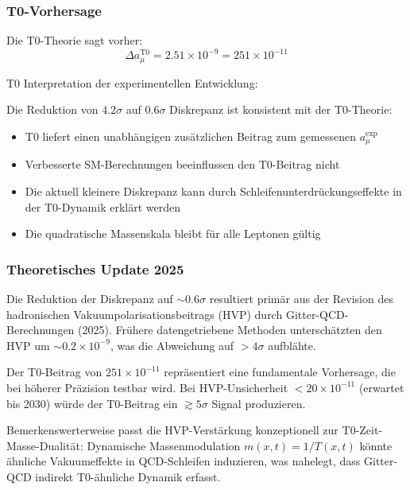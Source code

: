 \documentclass[12pt,a4paper]{article}
\begin{document}
	\subsubsection{T0-Vorhersage}
	Die T0-Theorie sagt vorher:
	\begin{equation}
		\Delta a_\mu^{\mathrm{T0}} = 2.51 \times 10^{-9} = 251 \times 10^{-11}
	\end{equation}
	
	\begin{explanation}
		T0 Interpretation der experimentellen Entwicklung:
		
		Die Reduktion von $4.2\sigma$ auf $0.6\sigma$ Diskrepanz ist konsistent mit der T0-Theorie:
		\begin{itemize}
			\item T0 liefert einen unabhängigen zusätzlichen Beitrag zum gemessenen $a_\mu^{\mathrm{exp}}$
			\item Verbesserte SM-Berechnungen beeinflussen den T0-Beitrag nicht
			\item Die aktuell kleinere Diskrepanz kann durch Schleifenunterdrückungseffekte in der T0-Dynamik erklärt werden
			\item Die quadratische Massenskala bleibt für alle Leptonen gültig
		\end{itemize}
	\end{explanation}
	
	\subsubsection{Theoretisches Update 2025}
	\begin{verification}
		Die Reduktion der Diskrepanz auf $\sim 0.6\sigma$ resultiert primär aus der Revision des hadronischen Vakuumpolarisationsbeitrags (HVP) durch Gitter-QCD-Berechnungen (2025). Frühere datengetriebene Methoden unterschätzten den HVP um $\sim 0.2 \times 10^{-9}$, was die Abweichung auf $>4\sigma$ aufblähte.
		
		Der T0-Beitrag von $251 \times 10^{-11}$ repräsentiert eine fundamentale Vorhersage, die bei höherer Präzision testbar wird. Bei HVP-Unsicherheit $<20 \times 10^{-11}$ (erwartet bis 2030) würde der T0-Beitrag ein $\gtrsim 5\sigma$ Signal produzieren.
		
		Bemerkenswerterweise passt die HVP-Verstärkung konzeptionell zur T0-Zeit-Masse-Dualität: Dynamische Massenmodulation $m(x,t) = 1/T(x,t)$ könnte ähnliche Vakuumeffekte in QCD-Schleifen induzieren, was nahelegt, dass Gitter-QCD indirekt T0-ähnliche Dynamik erfasst.
	\end{verification}
	
\end{document}
